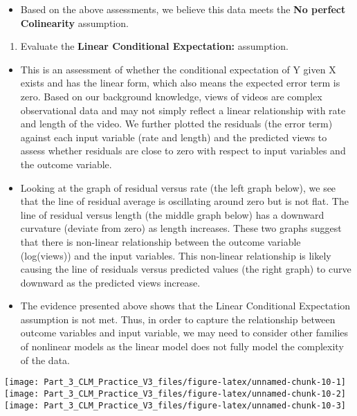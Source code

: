 \documentclass[
]{article}
\providecommand{\tightlist}{%
  \setlength{\itemsep}{0pt}\setlength{\parskip}{0pt}}
\begin{document}
\begin{itemize}
\tightlist
\item
  Based on the above assessments, we believe this data meets the
  \textbf{No perfect Colinearity} assumption.
\end{itemize}

\begin{enumerate}
\def\labelenumi{\arabic{enumi}.}
\setcounter{enumi}{2}
\tightlist
\item
  Evaluate the \textbf{Linear Conditional Expectation:} assumption.
\end{enumerate}

\begin{itemize}
\item
  This is an assessment of whether the conditional expectation of Y
  given X exists and has the linear form, which also means the expected
  error term is zero. Based on our background knowledge, views of videos
  are complex observational data and may not simply reflect a linear
  relationship with rate and length of the video. We further plotted the
  residuals (the error term) against each input variable (rate and
  length) and the predicted views to assess whether residuals are close
  to zero with respect to input variables and the outcome variable.
\item
  Looking at the graph of residual versus rate (the left graph below),
  we see that the line of residual average is oscillating around zero
  but is not flat. The line of residual versus length (the middle graph
  below) has a downward curvature (deviate from zero) as length
  increases. These two graphs suggest that there is non-linear
  relationship between the outcome variable (log(views)) and the input
  variables. This non-linear relationship is likely causing the line of
  residuals versus predicted values (the right graph) to curve downward
  as the predicted views increase.
\item
  The evidence presented above shows that the Linear Conditional
  Expectation assumption is not met. Thus, in order to capture the
  relationship between outcome variables and input variable, we may need
  to consider other families of nonlinear models as the linear model
  does not fully model the complexity of the data.
\end{itemize}

\texttt{[image: Part\_3\_CLM\_Practice\_V3\_files/figure-latex/unnamed-chunk-10-1]}
\texttt{[image: Part\_3\_CLM\_Practice\_V3\_files/figure-latex/unnamed-chunk-10-2]}
\texttt{[image: Part\_3\_CLM\_Practice\_V3\_files/figure-latex/unnamed-chunk-10-3]}
\end{document}
